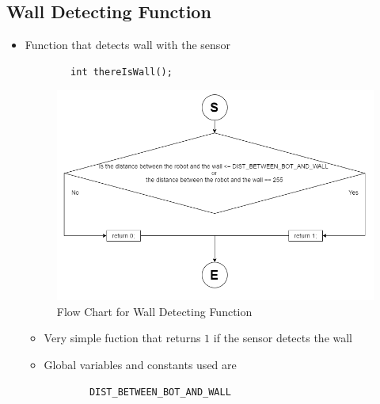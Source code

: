\documentclass[11pt]{article}
\begin{document}

\subsection{Wall Detecting Function}
\begin{itemize}
\item Function that detects wall with the sensor
	\begin{verbatim}
		int thereIsWall();
	\end{verbatim}
\begin{figure}[htp]
\centering
\includegraphics[scale=0.60]{images/Software_Flowchart/Detecting_Wall.png}
\caption{Flow Chart for Wall Detecting Function}
\label{}
\end{figure}
	\begin{itemize}
	\item Very simple fuction that returns $1$ if the sensor detects the wall
	\item Global variables and constants used are
	\begin{verbatim}
		DIST_BETWEEN_BOT_AND_WALL
	\end{verbatim}
	\end{itemize}
\end{itemize}
\newpage

\end{document}
